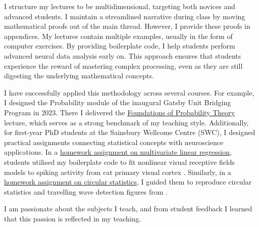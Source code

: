 \documentclass{article}
\begin{document}
I structure my lectures to be multidimensional, targeting both novices and
advanced students. I maintain a streamlined narrative during class by moving
mathematical proofs out of the main thread. However, I provide these proofs in
appendices.
%
My lectures contain multiple examples, usually in the form of computer
exercises. By providing boilerplate code, I help students perform advanced
neural data analysis early on. This approach ensures that students experience
the reward of mastering complex processing, even as they are still digesting
the underlying mathematical concepts.

I have successfully applied this methodology across several courses. For
example, I designed the Probability module of the inaugural Gatsby Unit
Bridging Program in 2023. There I delivered the
\href{https://github.com/joacorapela/gcnuBridging2023/blob/master/probability/lectures/2_foundations/foundations.pdf}{Foundations
of Probability Theory} lecture, which serves as a strong benchmark of my
teaching style.
%
Additionally, for first-year PhD students at the Sainsbury Wellcome Centre
(SWC), I designed practical assignments connecting statistical concepts with
neuroscience applications. In a
\href{https://github.com/joacorapela/neuroinformatics24/blob/master/worksheets/06_linearRegression/worksheet_linearRegression.pdf}{homework
assignment on multivariate linear regression}, students utilised my boilerplate
code to fit nonlinear visual receptive fields models to spiking activity from
cat primary visual cortex
\citep{rapelaEtAl06}. Similarly, in a
\href{https://github.com/joacorapela/neuroinformatics24/blob/master/worksheets/04_circularStats/worksheet_circularStatistics.pdf}{homework
assignment on circular statistics}, I guided them to reproduce circular
statistics and travelling wave detection figures from 
\citet{rapelaInPrepTWsInSpeech,rapelaInPrepSyncTWs,rapelaInPrepSyncTWsII}.

I am passionate about the subjects I teach, and from student feedback I learned
that this passion is reflected in my teaching.

\pagebreak


\end{document}
